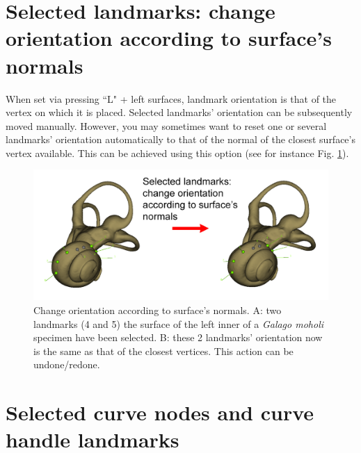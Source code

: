 \section{Selected landmarks: change orientation according to surface's normals}
When set via pressing ``L" + left surfaces, landmark orientation is that of the vertex on which it is
placed. Selected landmarks' orientation can be subsequently moved manually. However, you may
sometimes want to reset one or several landmarks' orientation automatically to that of the normal of the closest
surface's vertex available. This can be achieved using this option (see for instance Fig. \ref{reorient}).

\begin{figure}
  \centering
  \includegraphics[scale=0.27]{images/10/reorient.png} 
	\caption{Change orientation according to surface's normals. A: two landmarks (4 and 5) the surface of the left inner of a \textit{Galago moholi} specimen have been selected. B: these 2 landmarks' orientation now is the same as that of the closest vertices. This action can be undone/redone.}
\label{reorient}
 
\end{figure}


\section{Selected curve nodes and curve handle landmarks}\label{landmarks_curves_section}

